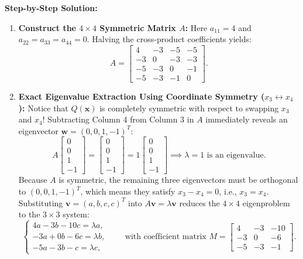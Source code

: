 \documentclass[11pt, letterpaper]{article}
\theoremstyle{definition}
\theoremstyle{remark}
\begin{document}
\textbf{Step-by-Step Solution:}
\begin{enumerate}[leftmargin=2em]
    \item \textbf{Construct the $4 \times 4$ Symmetric Matrix $A$:}
    Here $a_{11} = 4$ and $a_{22} = a_{33} = a_{44} = 0$. Halving the cross-product coefficients yields:
    \[
    A = \begin{bmatrix}
    4 & -3 & -5 & -5 \\
    -3 & 0 & -3 & -3 \\
    -5 & -3 & 0 & -1 \\
    -5 & -3 & -1 & 0
    \end{bmatrix}.
    \]
    \item \textbf{Exact Eigenvalue Extraction Using Coordinate Symmetry ($x_3 \leftrightarrow x_4$):}
    Notice that $Q(\mathbf{x})$ is completely symmetric with respect to swapping $x_3$ and $x_4$! Subtracting Column 4 from Column 3 in $A$ immediately reveals an eigenvector $\mathbf{w} = (0, 0, 1, -1)^T$:
    \[
    A \begin{bmatrix} 0 \\ 0 \\ 1 \\ -1 \end{bmatrix} = \begin{bmatrix} 0 \\ 0 \\ 1 \\ -1 \end{bmatrix} = 1 \begin{bmatrix} 0 \\ 0 \\ 1 \\ -1 \end{bmatrix} \implies \lambda = 1 \text{ is an eigenvalue.}
    \]
    Because $A$ is symmetric, the remaining three eigenvectors must be orthogonal to $(0, 0, 1, -1)^T$, which means they satisfy $x_3 - x_4 = 0$, i.e., $x_3 = x_4$. Substituting $\mathbf{v} = (a, b, c, c)^T$ into $A\mathbf{v} = \lambda \mathbf{v}$ reduces the $4 \times 4$ eigenproblem to the $3 \times 3$ system:
    \[
    \begin{cases}
    4a - 3b - 10c = \lambda a, \\
    -3a + 0b - 6c = \lambda b, \\
    -5a - 3b - c = \lambda c,
    \end{cases} \qquad \text{with coefficient matrix } M = \begin{bmatrix} 4 & -3 & -10 \\ -3 & 0 & -6 \\ -5 & -3 & -1 \end{bmatrix}.
\]
\end{enumerate}
\end{document}
